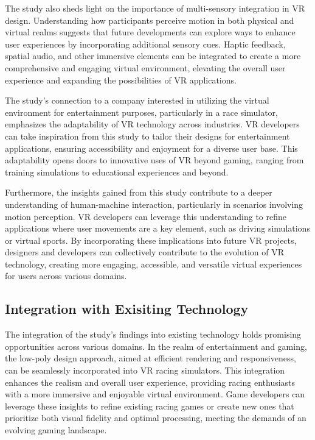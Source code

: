 \documentclass[a4paper, 12pt, oneside]{article}
\begin{document}
        The study also sheds light on the importance of multi-sensory integration in VR design. 
        Understanding how participants perceive motion in both physical and virtual realms suggests that future developments can 
        explore ways to enhance user experiences by incorporating additional sensory cues. Haptic feedback, spatial audio, and 
        other immersive elements can be integrated to create a more comprehensive and engaging virtual environment, elevating the 
        overall user experience and expanding the possibilities of VR applications.

        The study's connection to a company interested in utilizing the virtual environment for entertainment purposes, particularly 
        in a race simulator, emphasizes the adaptability of VR technology across industries. VR developers can take inspiration from 
        this study to tailor their designs for entertainment applications, ensuring accessibility and enjoyment for a diverse user 
        base. This adaptability opens doors to innovative uses of VR beyond gaming, ranging from training simulations to educational 
        experiences and beyond.

        Furthermore, the insights gained from this study contribute to a deeper understanding of human-machine interaction, 
        particularly in scenarios involving motion perception. VR developers can leverage this understanding to refine applications 
        where user movements are a key element, such as driving simulations or virtual sports. By incorporating these implications 
        into future VR projects, designers and developers can collectively contribute to the evolution of VR technology, creating 
        more engaging, accessible, and versatile virtual experiences for users across various domains.

        \subsection{Integration with Exisiting Technology}

        The integration of the study's findings into existing technology holds promising opportunities across various domains. In the realm of entertainment and gaming, the low-poly design approach, aimed at efficient rendering and responsiveness, can be seamlessly incorporated into VR racing simulators. This integration enhances the realism and overall user experience, 
        providing racing enthusiasts with a more immersive and enjoyable virtual environment. Game developers can leverage these insights
        to refine existing racing games or create new ones that prioritize both visual fidelity and optimal processing, meeting the 
        demands of an evolving gaming landscape.
\end{document}
